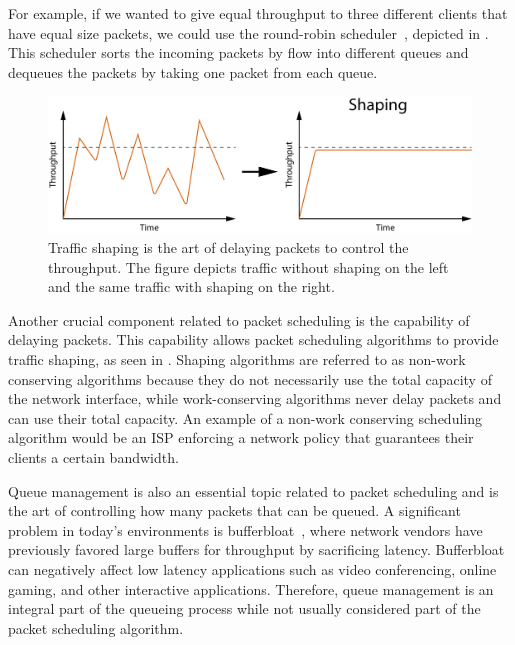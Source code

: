 \documentclass[sigconf, nonacm]{acmart}
\begin{document}
For example, if we wanted to give equal throughput to three different clients that have equal size packets, we could use the round-robin scheduler~\cite{nagle1987packet}, depicted in . This scheduler sorts the incoming packets by flow into different queues and dequeues the packets by taking one packet from each queue.


\begin{figure}
  \includegraphics[width=\linewidth]{traffic-shaping.pdf}
  \caption{Traffic shaping is the art of delaying packets to control the throughput. The figure depicts traffic without shaping on the left and the same traffic with shaping on the right.}
  \label{fig:traffic_shaping}
\end{figure}

Another crucial component related to packet scheduling is the capability of delaying packets. This capability allows packet scheduling algorithms to provide traffic shaping, as seen in . Shaping algorithms are referred to as non-work conserving algorithms because they do not necessarily use the total capacity of the network interface, while work-conserving algorithms never delay packets and can use their total capacity. An example of a non-work conserving scheduling algorithm would be an ISP enforcing a network policy that guarantees their clients a certain bandwidth.

Queue management is also an essential topic related to packet scheduling and is the art of controlling how many packets that can be queued. A significant problem in today's environments is bufferbloat~\cite{gettys2011bufferbloat}, where network vendors have previously favored large buffers for throughput by sacrificing latency. Bufferbloat~\cite{TODO} can negatively affect low latency applications such as video conferencing, online gaming, and other interactive applications. Therefore, queue management is an integral part of the queueing process while not usually considered part of the packet scheduling algorithm.
\end{document}
